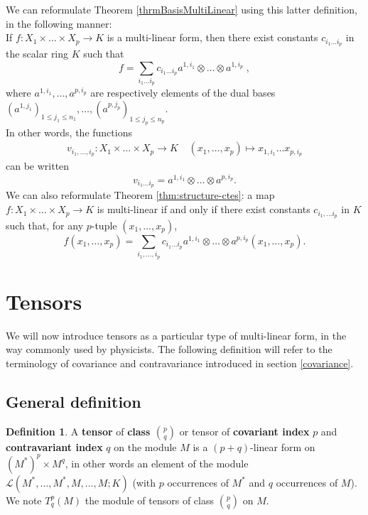 \documentclass{report}
\theoremstyle{definition}
\newtheorem{defin}{Definition}
\theoremstyle{remark}
\begin{document}
\bigskip
We can reformulate Theorem \ref{thrmBasisMultiLinear} using this latter definition, in the following manner:\\
If $f: X_1 \times \dots \times X_p \to K $ is a multi-linear form, then there exist constants $c_{i_1 \dots i_p}$ in the scalar ring $K$ such that
    \begin{equation*}
        f = \sum_{i_1 \dots i_p} c_{i_1 \dots i_p}a^{1,i_1}\otimes\dots\otimes a^{1,i_p}\;,
    \end{equation*}
    where $a^{1,i_1},\dots,a^{p,i_p}$ are respectively elements of the dual bases $(a^{1,j_1})_{1 \leq j_1 \leq n_1}, \dots, (a^{p,j_p})_{1 \leq j_p \leq n_p} $.\\ 
    In other words, the functions 
    \begin{equation*}
        \begin{split}
            v_{i_1, \dots, i_p}: X_1 \times \dots \times X_p \to K 
             \;\ \;\;(x_{1}, \dots, x_p) \mapsto x_{1,i_1} \dots x_{p,i_p}
        \end{split}
    \end{equation*}
    can be written 
    \begin{equation*}
        v_{i_1 \dots i_p} = a^{1,i_1} \otimes \dots \otimes a^{p, i_p}.
    \end{equation*}
 We can also reformulate Theorem \ref{thm:structure-ctes}: a map $f: X_1 \times \dots \times X_p \to K$ is multi-linear if and only if there exist constants $c_{i_1, \dots i_p}$ in $K$ such that, for any $p$-tuple $(x_1,\dots,x_p)$, 
 \begin{equation*}
     f (x_1,\dots,x_p) = \sum_{i_1,\dots,i_p} c_{i_1 \dots i_p}a^{1,i_1} \otimes \dots \otimes a^{p,i_p}(x_1,\dots,x_p). 
 \end{equation*}



\section{Tensors}


  
   \bigskip
   We will now introduce tensors as a particular type of multi-linear form, in the way commonly used by physicists. The following definition will refer to the terminology of covariance and contravariance introduced in section \ref{covariance}.

\subsection{General definition}
\begin{defin} A \textbf{tensor} of \textbf{class ${p \choose q}$} or tensor of \textbf{covariant index} $p$ and \textbf{contravariant index} $q$ on the module $M$ is a $(p+q)$-linear form on $(M^*)^p\times M^q$, in other words an element of the module $\mathcal{L}(M^*,\dots,M^*, M, \dots, M;K)$ (with $p$ occurrences of $M^*$ and $q$ occurrences of $M$). We note $T^p_q(M)$ the module of tensors of class ${p \choose q}$  on $M$.
\end{defin}
\end{document}
